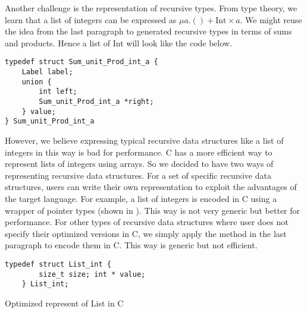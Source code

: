 Another challenge is the representation of recursive types. From type theory, we learn that a list of integers can be expressed as $\mu a. () + \text{Int} \times a$. We might reuse the idea from the last paragraph to generated recursive types in terms of sums and products. Hence a list of Int will look like the code below.
\begin{verbatim}
typedef struct Sum_unit_Prod_int_a {
    Label label;
    union {
        int left;
        Sum_unit_Prod_int_a *right;
    } value;
} Sum_unit_Prod_int_a
\end{verbatim}
However, we believe expressing typical recursive data structures like a list of integers in this way is bad for performance. C has a more efficient way to represent lists of integers using arrays. So we decided to have two ways of representing recursive data structures. For a set of specific recursive data structures, users can write their own representation to exploit the advantages of the target language. For example, a list of integers is encoded in C using a wrapper of pointer types (shown in ). This way is not very generic but better for performance. For other types of recursive data structures where user does not specify their optimized versions in C, we simply apply the method in the last paragraph to encode them in C. This way is generic but not efficient.
\begin{listing}[ht]
\begin{verbatim}
typedef struct List_int {
        size_t size; int * value;
    } List_int;
\end{verbatim}
\caption{Optimized represent of List in C}
\label{codegen:code:list}
\end{listing}
